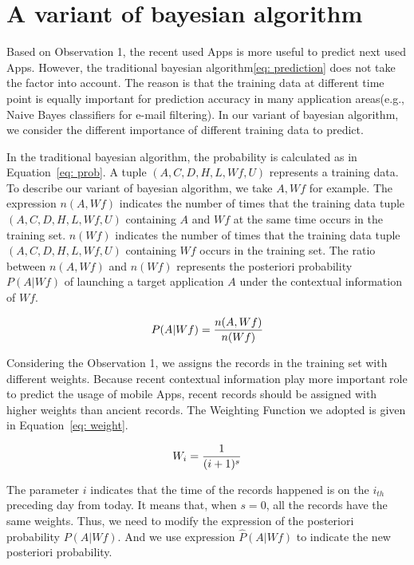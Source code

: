\section{A variant of bayesian algorithm}
\label{sec:design}
Based on Observation 1, the recent used Apps is more useful to predict next used Apps. However, the traditional bayesian algorithm\ref{eq: prediction} does not take the factor into account. The reason is that the training data at different time point is equally important for prediction accuracy in many application areas(e.g., Naive Bayes classifiers for e-mail filtering). In our variant of bayesian algorithm, we consider the different importance of different training data to predict.


In the traditional bayesian algorithm, the probability is calculated as in Equation~\ref{eq: prob}. A tuple $(A,C,D,H,L,Wf,U)$ represents a training data. To describe our variant of bayesian algorithm, we take $A,Wf$ for example. The expression $n(A,Wf)$ indicates the number of times that the training data tuple $(A,C,D,H,L,Wf,U)$ containing $A$ and $Wf$ at the same time occurs in the training set. $n(Wf)$ indicates the number of times that the training data tuple $(A,C,D,H,L,Wf,U)$ containing $Wf$ occurs in the training set. The ratio between $n(A,Wf)$ and $n(Wf)$ represents the posteriori probability $P(A|Wf)$ of launching a target application $A$ under the contextual information of $Wf$.


\begin{equation}
\footnotesize
\label{eq: prob}
    P(A|Wf)=\frac{n(A,Wf)}{n(Wf)}
\end{equation}


Considering the Observation 1, we assigns the records in the training set with different weights. Because recent contextual information play more important role to predict the usage of mobile Apps, recent records should be assigned with higher weights than ancient records. The Weighting Function we adopted is given in Equation~\ref{eq: weight}.


\begin{equation}
\footnotesize
\label{eq: weight}
    W_{i}=\frac{1}{(i+1)^s}
\end{equation}


The parameter $i$ indicates that the time of the records happened is on the $i_{th}$ preceding day from today. It means that, when $s=0$, all the records have the same weights. Thus, we need to modify the expression of the posteriori probability $P(A|Wf)$. And we use expression ${\hat P}(A|Wf)$ to indicate the new posteriori probability.


